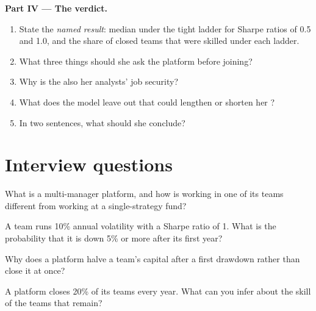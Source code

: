 \begin{problem}
\medskip\noindent\textbf{Part IV --- The verdict.}
\begin{enumerate}[resume]
\item State the \emph{named result}: median  under the tight ladder for Sharpe ratios of 0.5 and 1.0, and the
share of closed teams that were skilled under each ladder.
\item What three things should she ask the platform before joining?
\item Why is the  also her analysts' job security?
\item What does the model leave out that could lengthen or shorten her ?
\item In two sentences, what should she conclude?
\end{enumerate}
\end{problem}

\section{Interview questions}

\begin{interviewq}\label{iq:in:multi-manager-platforms:1}
What is a multi-manager platform, and how is working in one of its teams different from working at a single-strategy
fund?
\end{interviewq}

\begin{interviewq}\label{iq:in:multi-manager-platforms:2}
A team runs 10\% annual volatility with a Sharpe ratio of 1. What is the probability that it is down 5\% or more after
its first year?
\end{interviewq}

\begin{interviewq}\label{iq:in:multi-manager-platforms:3}
Why does a platform halve a team's capital after a first drawdown rather than close it at once?
\end{interviewq}

\begin{interviewq}\label{iq:in:multi-manager-platforms:4}
A platform closes 20\% of its teams every year. What can you infer about the skill of the teams that remain?
\end{interviewq}

